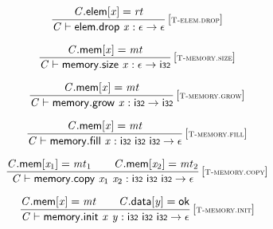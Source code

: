 $$
\begin{array}{@{}c@{}}\displaystyle
\frac{
{\mathit{C}}.\mathsf{elem}{}[{\mathit{x}}] = {\mathit{rt}}
}{
{\mathit{C}} \vdash \mathsf{elem.drop}~{\mathit{x}} : \epsilon \rightarrow \epsilon
} \, {[\textsc{\scriptsize T{-}elem.drop}]}
\qquad
\end{array}
$$

\vspace{1ex}

$$
\begin{array}{@{}c@{}}\displaystyle
\frac{
{\mathit{C}}.\mathsf{mem}{}[{\mathit{x}}] = {\mathit{mt}}
}{
{\mathit{C}} \vdash \mathsf{memory.size}~{\mathit{x}} : \epsilon \rightarrow \mathsf{i{\scriptstyle32}}
} \, {[\textsc{\scriptsize T{-}memory.size}]}
\qquad
\end{array}
$$

$$
\begin{array}{@{}c@{}}\displaystyle
\frac{
{\mathit{C}}.\mathsf{mem}{}[{\mathit{x}}] = {\mathit{mt}}
}{
{\mathit{C}} \vdash \mathsf{memory.grow}~{\mathit{x}} : \mathsf{i{\scriptstyle32}} \rightarrow \mathsf{i{\scriptstyle32}}
} \, {[\textsc{\scriptsize T{-}memory.grow}]}
\qquad
\end{array}
$$

$$
\begin{array}{@{}c@{}}\displaystyle
\frac{
{\mathit{C}}.\mathsf{mem}{}[{\mathit{x}}] = {\mathit{mt}}
}{
{\mathit{C}} \vdash \mathsf{memory.fill}~{\mathit{x}} : \mathsf{i{\scriptstyle32}}~\mathsf{i{\scriptstyle32}}~\mathsf{i{\scriptstyle32}} \rightarrow \epsilon
} \, {[\textsc{\scriptsize T{-}memory.fill}]}
\qquad
\end{array}
$$

$$
\begin{array}{@{}c@{}}\displaystyle
\frac{
{\mathit{C}}.\mathsf{mem}{}[{\mathit{x}}_{{1}}] = {\mathit{mt}}_{{1}}
 \qquad
{\mathit{C}}.\mathsf{mem}{}[{\mathit{x}}_{{2}}] = {\mathit{mt}}_{{2}}
}{
{\mathit{C}} \vdash \mathsf{memory.copy}~{\mathit{x}}_{{1}}~{\mathit{x}}_{{2}} : \mathsf{i{\scriptstyle32}}~\mathsf{i{\scriptstyle32}}~\mathsf{i{\scriptstyle32}} \rightarrow \epsilon
} \, {[\textsc{\scriptsize T{-}memory.copy}]}
\qquad
\end{array}
$$

$$
\begin{array}{@{}c@{}}\displaystyle
\frac{
{\mathit{C}}.\mathsf{mem}{}[{\mathit{x}}] = {\mathit{mt}}
 \qquad
{\mathit{C}}.\mathsf{data}{}[{\mathit{y}}] = \mathsf{ok}
}{
{\mathit{C}} \vdash \mathsf{memory.init}~{\mathit{x}}~{\mathit{y}} : \mathsf{i{\scriptstyle32}}~\mathsf{i{\scriptstyle32}}~\mathsf{i{\scriptstyle32}} \rightarrow \epsilon
} \, {[\textsc{\scriptsize T{-}memory.init}]}
\qquad
\end{array}
$$

